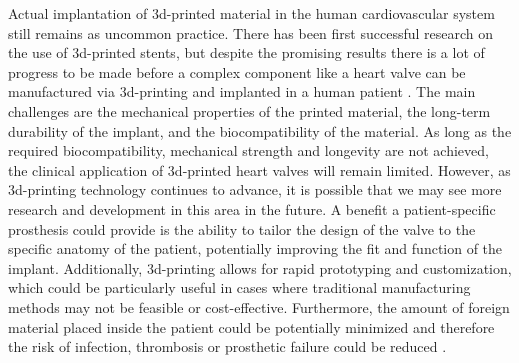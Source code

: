 Actual implantation of \gls{3d}-printed material in the human cardiovascular system still remains as uncommon practice. There has been first successful research on the use of \gls{3d}-printed stents, but despite the promising results \cite{feng2024first} there is a lot of progress to be made before a complex component like a heart valve can be manufactured via \gls{3d}-printing and implanted in a human patient \cite{levin20203d}. The main challenges are the mechanical properties of the printed material, the long-term durability of the implant, and the biocompatibility of the material. As long as the required biocompatibility, mechanical strength and longevity are not achieved, the clinical application of \gls{3d}-printed heart valves will remain limited. However, as \gls{3d}-printing technology continues to advance, it is possible that we may see more research and development in this area in the future. A benefit a patient-specific prosthesis could provide is the ability to tailor the design of the valve to the specific anatomy of the patient, potentially improving the fit and function of the implant. Additionally, \gls{3d}-printing allows for rapid prototyping and customization, which could be particularly useful in cases where traditional manufacturing methods may not be feasible or cost-effective. Furthermore, the amount of foreign material placed inside the patient could be potentially minimized and therefore the risk of infection, thrombosis or prosthetic failure could be reduced \cite{bhandari2023trends}.